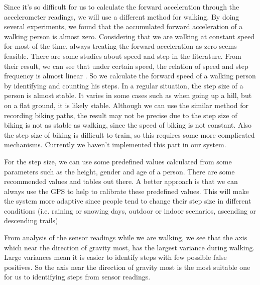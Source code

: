 \documentclass[journal]{IEEEtran}
\begin{document}
Since it's so difficult for us to calculate the forward acceleration through the accelerometer readings, we will use a different method for walking.
By doing several experiments, we found that the accumulated forward acceleration of a walking person is almost zero.
Considering that we are walking at constant speed for most of the time, always treating the forward acceleration as zero seems feasible.
There are some studies about speed and step in the literature.
From their result, we can see that under certain speed, the relation of speed and step frequency is almost linear \cite{Speed and Step}.
So we calculate the forward speed of a walking person by identifying and counting his steps.
In a regular situation, the step size of a person is almost stable.
It varies in some cases such as when going up a hill, but on a flat ground, it is likely stable.
Although we can use the similar method for recording biking paths, the result may not be precise due to the step size of biking is not as stable as walking, since the speed of biking is not constant.
Also the step size of biking is difficult to train, so this requires some more complicated mechanisms.
Currently we haven't implemented this part in our system.

For the step size, we can use some predefined values calculated from some parameters such as the height, gender and age of a person. 
There are some recommended values and tables out there.
A better approach is that we can always use the GPS to help to calibrate these predefined values.
This will make the system more adaptive since people tend to change their step size in different conditions (i.e. raining or snowing days, outdoor or indoor scenarios, ascending or descending trails)

From analysis of the sensor readings while we are walking, we see that the axis which near the direction of gravity most, has the largest variance during walking.
Large variances mean it is easier to identify steps with few possible false positives.
So the axis near the direction of gravity most is the most suitable one for us to identifying steps from sensor readings.
\end{document}
